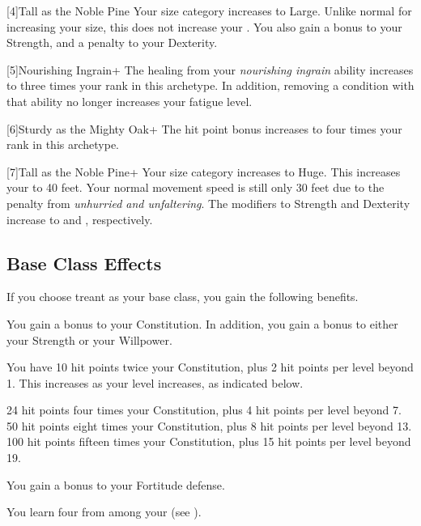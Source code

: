     [4]{Tall as the Noble Pine} Your size category increases to Large.
      Unlike normal for increasing your size, this does not increase your .
      You also gain a  bonus to your Strength, and a  penalty to your Dexterity.

    [5]{Nourishing Ingrain+} The healing from your \textit{nourishing ingrain} ability increases to three times your rank in this archetype.
      In addition, removing a condition with that ability no longer increases your fatigue level.

    [6]{Sturdy as the Mighty Oak+} The hit point bonus increases to four times your rank in this archetype.

    [7]{Tall as the Noble Pine+} Your size category increases to Huge.
      This increases your  to 40 feet.
      Your normal movement speed is still only 30 feet due to the penalty from \textit{unhurried and unfaltering}.
      The modifiers to Strength and Dexterity increase to  and , respectively.

  \subsection{Base Class Effects}
    If you choose treant as your base class, you gain the following benefits.

      You gain a  bonus to your Constitution. In addition, you gain a  bonus to either your Strength or your Willpower.

      You have 10 hit points \add twice your Constitution, plus 2 hit points per level beyond 1.
      This increases as your level increases, as indicated below.
      \begin{itemize}
         24 hit points \add four times your Constitution, plus 4 hit points per level beyond 7.
         50 hit points \add eight times your Constitution, plus 8 hit points per level beyond 13.
         100 hit points \add fifteen times your Constitution, plus 15 hit points per level beyond 19.
      \end{itemize}

      You gain a  bonus to your Fortitude defense.

      You learn four  from among your  (see ).

